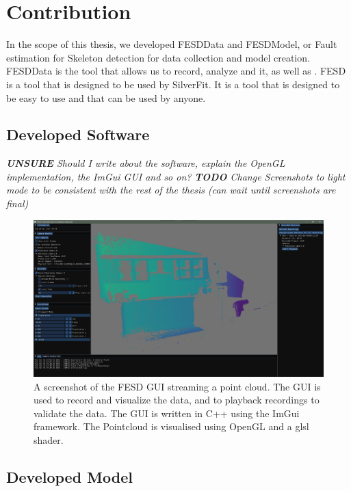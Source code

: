 \section{Contribution}
\label{sec:contribution}

In the scope of this thesis, we developed FESDData and FESDModel, or Fault estimation for Skeleton detection for data collection and model creation. FESDData is the tool that allows us to record, analyze and it, as well as . FESD is a tool that is designed to be used by SilverFit. It is a tool that is designed to be easy to use and that can be used by anyone. 

\subsection{Developed Software}

\textit{\textbf{UNSURE} Should I write about the software, explain the OpenGL implementation, the ImGui GUI and so on?}
\textit{\textbf{TODO} Change Screenshots to light mode to be consistent with the rest of the thesis (can wait until screenshots are final)}

\begin{figure}[ht]
  \centering
  \includegraphics[width=\linewidth]{figures/FESD/all.png}
  \caption[FESD GUI]{A screenshot of the FESD GUI streaming a point cloud. The GUI is used to record and visualize the data, and to playback recordings to validate the data. The GUI is written in C++ using the ImGui framework. The Pointcloud is visualised using OpenGL and a glsl shader.}
  \label{fig:stream_gui}
\end{figure}

\subsection{Developed Model}